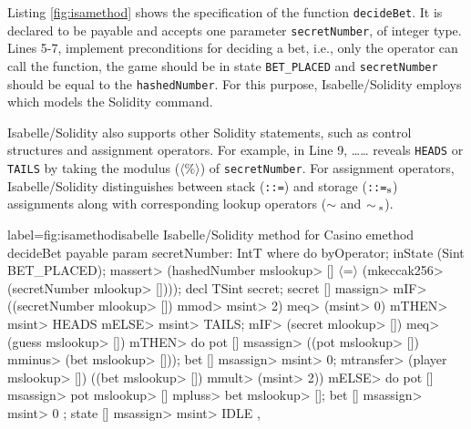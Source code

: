 \documentclass[a4paper,UKenglish,cleveref, autoref, thm-restate]{oasics-v2021}
\begin{document}
Listing \ref{fig:isamethod} shows the specification of the function \texttt{decideBet}.
It is declared to be payable and accepts one parameter \texttt{secretNumber}, of integer type.
Lines 5-7, implement preconditions for deciding a bet, i.e., only the operator can call the function, the game should be in state \texttt{BET\_PLACED} and \texttt{secretNumber} should be equal to the \texttt{hashedNumber}. 
For this purpose, Isabelle/Solidity employs \texttt{\color{isarblue}{assert}} which models the Solidity \texttt{\color{blue}{require}} command. 

Isabelle/Solidity also supports other Solidity statements, such as control structures and assignment operators.
For example, in Line 9, \texttt{\color{isarblue}{IF}}\dots \texttt{\color{isarblue}{THEN}}\dots \texttt{\color{isarblue}{ELSE}} reveals \texttt{HEADS} or \texttt{TAILS} by taking the modulus (\texttt{$\langle\%\rangle$}) of \texttt{secretNumber}. 
For assignment operators, Isabelle/Solidity distinguishes between stack (\texttt{::=}) and storage (\texttt{::=}$\textsubscript{s}$) assignments along with corresponding lookup operators ($\sim$ and $\sim\textsubscript{s}$). 

\begin{code}{label={fig:isamethod}}{isabelle}{%
  Isabelle/Solidity method for Casino%
  \hfill{}%
}
emethod decideBet payable
  param secretNumber: IntT
where
  do {
    byOperator;
    inState (Sint BET_PLACED);
    \<massert> (hashedNumber \<mslookup> [] $\langle$=$\rangle$ (\<mkeccak256> (secretNumber \<mlookup> [])));
    decl TSint secret;
    secret [] \<massign> \<mIF> ((secretNumber \<mlookup> []) \<mmod> \<msint> 2) \<meq> (\<msint> 0) 
    				        \<mTHEN> \<msint> HEADS \<mELSE> \<msint> TAILS;
    \<mIF> (secret \<mlookup> []) \<meq> (guess \<mslookup> []) \<mTHEN>
      do {
        pot [] \<msassign> ((pot \<mslookup> []) \<mminus> (bet \<mslookup> []));
        bet [] \<msassign> \<msint> 0;
        \<mtransfer> (player \<mslookup> []) ((bet \<mslookup> []) \<mmult> (\<msint> 2))
      }
    \<mELSE>
      do {
        pot [] \<msassign> pot \<mslookup> [] \<mpluss> bet \<mslookup> [];
        bet [] \<msassign> \<msint> 0
      };
    state [] \<msassign> \<msint> IDLE
  },
\end{code}
%
\end{document}

